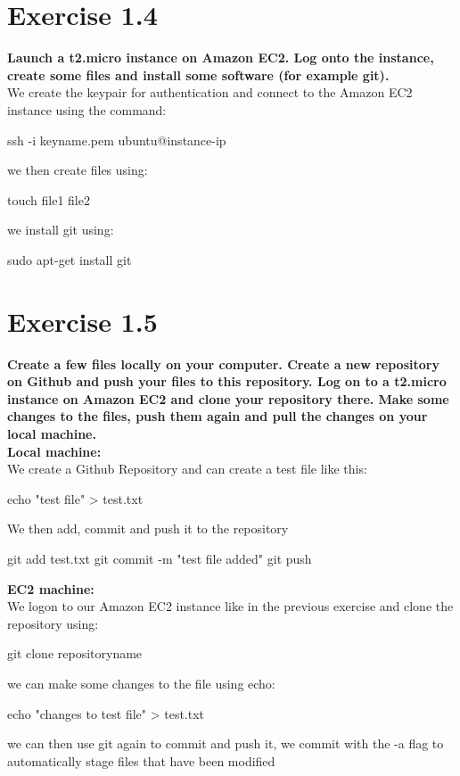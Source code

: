 \documentclass{article}
\begin{document}
\section{Exercise 1.4}
\textbf{Launch a t2.micro instance on Amazon EC2. Log onto the instance, create some files and install some software (for example git).}\\
We create the keypair for authentication and connect to the Amazon EC2 instance using the command:
\begin{pythonOutput}
ssh -i keyname.pem ubuntu@instance-ip
\end{pythonOutput}
we then create files using:
\begin{pythonOutput}
touch file1 file2
\end{pythonOutput}
we install git using:
\begin{pythonOutput}
sudo apt-get install git
\end{pythonOutput}
\section{Exercise 1.5}
\textbf{Create a few files locally on your computer. Create a new repository on Github and push your files to this repository. Log on to a t2.micro instance on Amazon EC2 and clone your repository there. Make some changes to the files, push them again and pull the changes on your local machine.}\\

\textbf{Local machine:}\\
We create a Github Repository and can create a test file like this:
\begin{pythonOutput}
echo "test file" > test.txt
\end{pythonOutput}
We then add, commit and push it to the repository
\begin{pythonOutput}
git add test.txt
git commit -m "test file added"
git push
\end{pythonOutput}

\textbf{EC2 machine:}\\
We logon to our Amazon EC2 instance like in the previous exercise and clone the repository using:
\begin{pythonOutput}
git clone repositoryname
\end{pythonOutput}
we can make some changes to the file using echo:
\begin{pythonOutput}
echo "changes to test file" > test.txt
\end{pythonOutput}
we can then use git again to commit and push it, we commit with the -a flag to automatically stage files that have been modified
\end{document}
